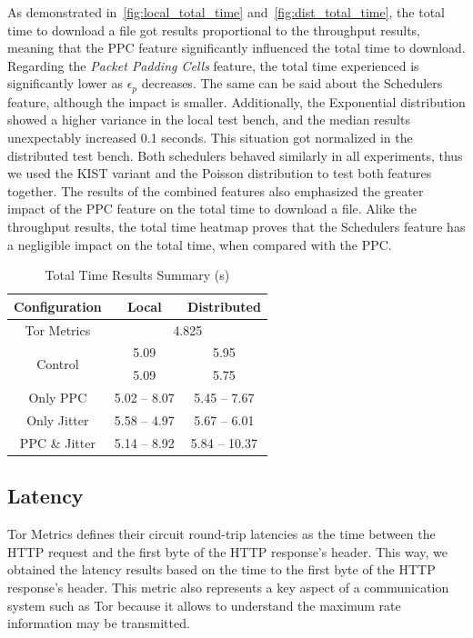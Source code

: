 As demonstrated in~\cref{fig:local_total_time} and~\cref{fig:dist_total_time}, the total time to download a file got results proportional to the throughput results, meaning that the PPC feature significantly influenced the total time to download. Regarding the \textit{Packet Padding Cells} feature, the total time experienced is significantly lower as $\epsilon_p$ decreases. The same can be said about the Schedulers feature, although the impact is smaller. Additionally, the Exponential distribution showed a higher variance in the local test bench, and the median results unexpectably increased 0.1 seconds. This situation got normalized in the distributed test bench.   
Both schedulers behaved similarly in all experiments, thus we used the KIST variant and the Poisson distribution to test both features together. The results of the combined features also emphasized the greater impact of the PPC feature on the total time to download a file. Alike the throughput results, the total time heatmap proves that the Schedulers feature has a negligible impact on the total time, when compared with the PPC.\@
\begin{table}[htbp]
    \centering
    \begin{tabular}{|c|c|c|}
    \hline
    \textbf{Configuration} & \textbf{Local} & \textbf{Distributed} \\
    \hline
    Tor Metrics &  \multicolumn{2}{c|}{4.825} \\ 
    \hline
    \multirow{2}{*}{Control} & 5.09 & 5.95\\ 
    & 5.09 & 5.75\\
    \hline
    Only PPC & 5.02 – 8.07 & 5.45 – 7.67\\
    \hline
    Only Jitter & 5.58 – 4.97 & 5.67 – 6.01\\
    \hline
    PPC \& Jitter & 5.14 – 8.92 & 5.84 – 10.37\\
    \hline
    \end{tabular}
    \caption{Total Time Results Summary (s)}\label{tab:total_time_summary}
\end{table}

\FloatBarrier
\subsection{Latency}

Tor Metrics defines their circuit round-trip latencies as the time between the HTTP request and the first byte of the HTTP response's header. This way, we obtained the latency results based on the time to the first byte of the HTTP response's header. This metric also represents a key aspect of a communication system such as Tor because it allows to understand the maximum rate information may be transmitted. 

